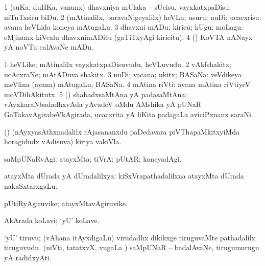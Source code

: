\bentry
{} 
\gl{\sakirx}
\expl{}
\bmng
\bnum
\num{1} (suKa, duHKa, \mo vanunx) dhavxniya mUlaka -- sUcisu, vayxkatxpaDisu:  niTuTxsiru biDu. 
\num{2} (mAtinalilx, baravaNigeyalilx) heVLu; usuru; nuDi; ucacxrisu:  avanu heVLida koneya mAtugaLu. 
\num{3} dhavxni mADu; kiricu; kUgu; moLagu:  eMjinunx kiVcalu dhavxnimADitu (gaTiTxyAgi kiricitu). 
\num{4} (\nAyxshA) KoVTA nANayx yA noVTu calAvaNe mADu. 
\enum
\emng
\eentry

\bentry
{} 
\gl{\nA}
\bmng
\bnum
\num{1} heVLike; mAtinalilx vayxkatxpaDisuvudu, heVLuvudu. 
\num{2} vAkfshakitx; ucAcxraNe; mAtADuva shakitx. 
\num{3} nuDi; vacana; ukitx; BASaNa:  veVdikeya meVlina (avana) mAtugaLu, BASaNa. 
\num{4} mAtina riVti:  avana mAtina riVtiyeV moVDihAkitutx. 
\num{5} (\BAshA) shabadxsaMtAna yA padasaMtAna; vAyxkaraNbadadhxvAda yAvudeV oMdu AMshika yA pUNaR GaTakavAgirabeVkAgirada, ucacxrita yA liKita padagaLa aviciPxnanx saraNi. 
\enum
\emng
\eentry

\bentry
{}
\gl{\nA}
\expl{}
\bmng
(\birx) (nAyxyasAthxnadalilx rAjasananxdu paDedavara piVThapaMkitxyiMda horagidudx vAdisuva) kiriya vakiVla. 
\emng
\eentry

\bentry
{} 
\gl{\kirxvi}
\expl{}
\bmng
saMpUNaRvAgi; atayxMta; tiVrA; pUtAR; koneyadAgi. 
\emng
\eentry

\bentry
{} 
\gl{\gu}
\expl{}
\bmng
atayxMta dUrada yA dUradalilxya:  kiSxVrapathadalilxna atayxMta dUrada nakaSxtarxgaLu. 
\emng
\eentry

\bentry
{} 
\gl{\nA}
\expl{}
\bmng
pUtiRyAgiruvike; atayxMtavAgiruvike. 
\emng
\eentry

\bentry
{} 
\gl{\nA}
\expl{}
\bmng
{} AkArada koLavi; `yU' koLave. 
\emng
\eentry

\bentry
{} 
\gl{\nA}
\expl{}
\bmng
\banum
{} `yU' tiruvu; (vAhana itAyxdigaLu) virudadhx dikikxge tiruguvaMte  pathadalilx tiruguvudu. 
 (niVti, tatatxvX, \mo vugaLa \vi) saMpUNaR -- badalAvaNe, tirugumurugu yA radidxyAti. 
\eanum
\emng
\eentry

\bentry 
{}
\gl{\saMkiSx}
\expl{}
\bmng
{} 
\emng
\eentry

